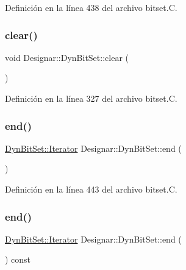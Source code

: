 Definición en la línea 438 del archivo bitset.\+C.

\mbox{\label{class_designar_1_1_dyn_bit_set_af73666f08fda747f5d2dd9c1343f884f}} 
\subsubsection{\texorpdfstring{clear()}{clear()}}
{\footnotesize\ttfamily void Designar\+::\+Dyn\+Bit\+Set\+::clear (\begin{DoxyParamCaption}{ }\end{DoxyParamCaption})}



Definición en la línea 327 del archivo bitset.\+C.

\mbox{\label{class_designar_1_1_dyn_bit_set_a2d7725ebf960363167ccabaacd37bec6}} 
\subsubsection{\texorpdfstring{end()}{end()}\hspace{0.1cm}{\footnotesize\ttfamily [1/2]}}
{\footnotesize\ttfamily \hyperlink{class_designar_1_1_dyn_bit_set_1_1_iterator}{Dyn\+Bit\+Set\+::\+Iterator} Designar\+::\+Dyn\+Bit\+Set\+::end (\begin{DoxyParamCaption}{ }\end{DoxyParamCaption})}



Definición en la línea 443 del archivo bitset.\+C.

\mbox{\label{class_designar_1_1_dyn_bit_set_a1ca3f63ddb290be233b1311d1b4439b2}} 
\subsubsection{\texorpdfstring{end()}{end()}\hspace{0.1cm}{\footnotesize\ttfamily [2/2]}}
{\footnotesize\ttfamily \hyperlink{class_designar_1_1_dyn_bit_set_1_1_iterator}{Dyn\+Bit\+Set\+::\+Iterator} Designar\+::\+Dyn\+Bit\+Set\+::end (\begin{DoxyParamCaption}{ }\end{DoxyParamCaption}) const}



